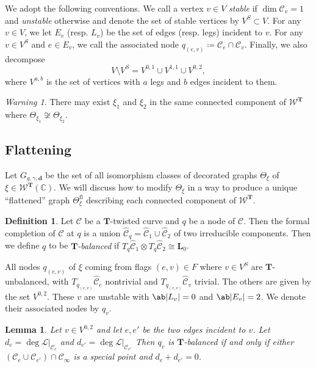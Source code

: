 \documentclass{amsart}
\newtheorem{lem}[thm]{Lemma}
\theoremstyle{definition}
\newtheorem{defn}[thm]{Definition}
\theoremstyle{remark}
\newtheorem{warn}[thm]{Warning}
\theoremstyle{plain}
\theoremstyle{definition}
\theoremstyle{remark}
\newcommand{\C}{\mathbb{C}}
\newcommand{\T}{\mathbf{T}}
\newcommand{\mc}[1]{\mathcal{#1}}
\newcommand{\mbf}[1]{\mathbf{#1}}
\newcommand{\mr}[1]{\mathrm{#1}}
\newcommand{\wh}[1]{\widehat{#1}}
\newcommand{\1}{\mathbf{1}}
\newcommand{\2}{\mathbf{2}}
\newcommand{\3}{\mathbf{3}}
\begin{document}
We adopt the following conventions. We call a vertex $v \in V$ \textit{stable} if $\dim \mc{C}_v = 1$ and \textit{unstable} otherwise and denote the set of stable vertices by $V^S \subset V$. For any $v \in V$, we let $E_v$ (resp. $L_v$) be the set of edges (resp. legs) incident to $v$. For any $v \in V^S$ and $e \in E_v$, we call the associated node $q_{(e,v)} \coloneqq \mc{C}_e \cap \mc{C}_v$. Finally, we also decompose
\[ V \setminus V^S = V^{0,1} \cup V^{1,1} \cup V^{0,2}, \]
where $V^{a,b}$ is the set of vertices with $a$ legs and $b$ edges incident to them.

\begin{warn}
    There may exist $\xi_1$ and $\xi_2$ in the same connected component of $\mc{W}^{\T}$ where $\Theta_{\xi_1} \not\cong \Theta_{\xi_2}$.
\end{warn}


\subsection{Flattening}

Let $G_{g,\gamma,\mbf{d}}$ be the set of all isomorphism classes of decorated graphs $\Theta_{\xi}$ of $\xi \in \mc{W}^{\T}(\C)$. We will discuss how to modify $\Theta_{\xi}$ in a way to produce a unique ``flattened'' graph $\Theta_{\xi}^{\mr{fl}}$ describing each connected component of $\mc{W}^{\T}$.

\begin{defn}
    Let $\mc{C}$ be a $\T$-twisted curve and $q$ be a node of $\mc{C}$. Then the formal completion of $\mc{C}$ at $q$ is a union $\wh{\mc{C}}_q = \wh{\mc{C}}_1 \cup \wh{\mc{C}}_2$ of two irreducible components. Then we define $q$ to be \textit{$\T$-balanced} if $T_q \wh{\mc{C}}_1 \otimes T_q \wh{\mc{C}}_2 \cong \mbf{L}_0$.
\end{defn}

All nodes $q_{(e,v)}$ of $\xi$ coming from flags $(e,v) \in F$ where $v \in V^S$ are $\T$-unbalanced, with $T_{q_{(e,v)}} \wh{\mc{C}}_e$ nontrivial and $T_{q_{(e,v)}} \wh{\mc{C}}_v$ trivial. The others are given by the set $V^{0,2}$.
These $v$ are unstable with $\ab|L_v| = 0$ and $\ab|E_v| = 2$. We denote their associated nodes by $q_v$. 

\begin{lem}\label{lem:balancednode}
    Let $v \in V^{0,2}$ and let $e, e'$ be the two edges incident to $v$. Let $d_e = \deg \mc{L}|_{\mc{C}_e}$ and $d_{e'} = \deg \mc{L}|_{\mc{C}_{e'}}$ Then $q_v$ is $\T$-balanced if and only if either $(\mc{C}_e \cup \mc{C}_{e'}) \cap \mc{C}_{\infty}$ is a special point and $d_e + d_{e'} = 0$.
\end{lem}
\end{document}
